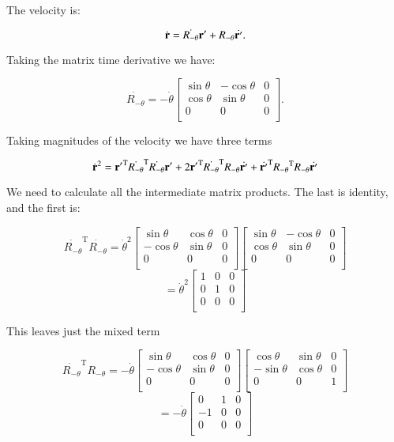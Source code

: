 \documentclass{article}      %
\newcommand{\dt}[1]{\dot{#1}}
\newcommand{\transpose}[1]{{#1}^{\text{T}}}
\begin{document}
The velocity is:

\[
\dt{\Br} = \dt{R_{-\theta}}\Br' + R_{-\theta}\dt{\Br'}.
\]

Taking the matrix time derivative we have:

\[
\dt{R_{-\theta}} =
-\dt{\theta}
\begin{bmatrix}
\sin \theta & -\cos \theta & 0 \\
\cos \theta & \sin \theta & 0 \\
0 & 0 & 0 \\
\end{bmatrix}.
\]

Taking magnitudes of the velocity we have three terms

\[
\dt{\Br}^2 = 
\transpose{\Br'} \transpose{\dt{R_{-\theta}}} \dt{R_{-\theta}}\Br'
+2 \transpose{{\Br'}} \transpose{\dt{R_{-\theta}}} R_{-\theta} \dt{\Br'}
+\transpose{\dt{\Br'}} \transpose{R_{-\theta}} R_{-\theta}\dt{\Br'}
\]

We need to calculate all the intermediate matrix products.  The last is 
identity, and the first is:

\[
\transpose{\dt{R_{-\theta}}} \dt{R_{-\theta}}
=
{\dt{\theta}}^2
\begin{bmatrix}
\sin \theta & \cos \theta & 0 \\
-\cos \theta & \sin \theta & 0 \\
0 & 0 & 0 \\
\end{bmatrix}
\begin{bmatrix}
\sin \theta & -\cos \theta & 0 \\
\cos \theta & \sin \theta & 0 \\
0 & 0 & 0 \\
\end{bmatrix}
\]
\[
=
{\dt{\theta}}^2
\begin{bmatrix}
1 & 0 & 0 \\
0 & 1 & 0 \\
0 & 0 & 0 \\
\end{bmatrix}
\]

This leaves just the mixed term

\[
\transpose{\dt{R_{-\theta}}} {R_{-\theta}}
=
-{\dt{\theta}}
\begin{bmatrix}
\sin \theta & \cos \theta & 0 \\
-\cos \theta & \sin \theta & 0 \\
0 & 0 & 0 \\
\end{bmatrix}
\begin{bmatrix}
\cos \theta & \sin \theta & 0 \\
-\sin \theta & \cos \theta & 0 \\
0 & 0 & 1 \\
\end{bmatrix}
\]
\[
=
-{\dt{\theta}}
\begin{bmatrix}
0 & 1 & 0 \\
-1 & 0 & 0 \\
0 & 0 & 0 \\
\end{bmatrix}
\]
\end{document}
